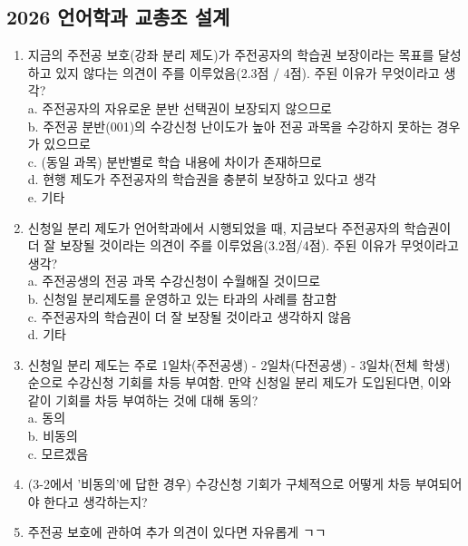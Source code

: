\documentclass{oblivoir}
\begin{document}
\subsection{2026 언어학과 교총조 설계}
\begin{enumerate}
    \item [3-1] 지금의 주전공 보호(강좌 분리 제도)가 주전공자의 학습권 보장이라는 목표를 달성하고 있지 않다는 의견이 주를 이루었음(2.3점 / 4점). 주된 이유가 무엇이라고 생각? \\ a. 주전공자의 자유로운 분반 선택권이 보장되지 않으므로 \\ b. 주전공 분반(001)의 수강신청 난이도가 높아 전공 과목을 수강하지 못하는 경우가 있으므로 \\ c. (동일 과목) 분반별로 학습 내용에 차이가 존재하므로 \\ d. 현행 제도가 주전공자의 학습권을 충분히 보장하고 있다고 생각 \\ e. 기타
    \item [3-2] 신청일 분리 제도가 언어학과에서 시행되었을 때, 지금보다 주전공자의 학습권이 더 잘 보장될 것이라는 의견이 주를 이루었음(3.2점/4점). 주된 이유가 무엇이라고 생각? \\ a. 주전공생의 전공 과목 수강신청이 수월해질 것이므로 \\ b. 신청일 분리제도를 운영하고 있는 타과의 사례를 참고함 \\ c. 주전공자의 학습권이 더 잘 보장될 것이라고 생각하지 않음 \\ d. 기타
    \item [3-3] 신청일 분리 제도는 주로 1일차(주전공생) - 2일차(다전공생) - 3일차(전체 학생) 순으로 수강신청 기회를 차등 부여함. 만약 신청일 분리 제도가 도입된다면, 이와 같이 기회를 차등 부여하는 것에 대해 동의? \\ a. 동의 \\ b. 비동의 \\ c. 모르겠음
    \item [3-4] (3-2에서 '비동의'에 답한 경우) 수강신청 기회가 구체적으로 어떻게 차등 부여되어야 한다고 생각하는지?
    \item [3-5] 주전공 보호에 관하여 추가 의견이 있다면 자유롭게 ㄱㄱ
\end{enumerate}
\end{document}
